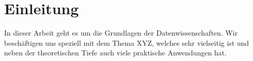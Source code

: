 \section{Einleitung}
In dieser Arbeit geht es um die Grundlagen der Datenwissenschaften. 
Wir beschäftigen uns speziell mit dem Thema XYZ,
welches sehr vielseitig ist und neben der theoretischen Tiefe auch viele praktische Anwendungen hat.